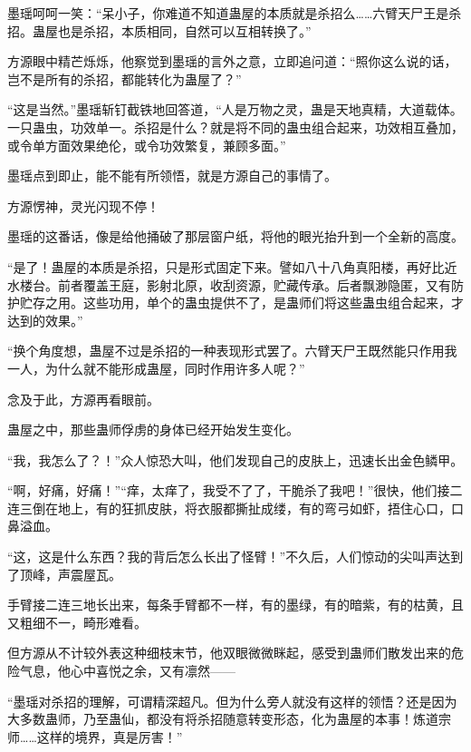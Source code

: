\begin{this_body}
墨瑶呵呵一笑：“呆小子，你难道不知道蛊屋的本质就是杀招么……六臂天尸王是杀招。蛊屋也是杀招，本质相同，自然可以互相转换了。”

方源眼中精芒烁烁，他察觉到墨瑶的言外之意，立即追问道：“照你这么说的话，岂不是所有的杀招，都能转化为蛊屋了？”

“这是当然。”墨瑶斩钉截铁地回答道，“人是万物之灵，蛊是天地真精，大道载体。一只蛊虫，功效单一。杀招是什么？就是将不同的蛊虫组合起来，功效相互叠加，或令单方面效果绝伦，或令功效繁复，兼顾多面。”

墨瑶点到即止，能不能有所领悟，就是方源自己的事情了。

方源愣神，灵光闪现不停！

墨瑶的这番话，像是给他捅破了那层窗户纸，将他的眼光抬升到一个全新的高度。

“是了！蛊屋的本质是杀招，只是形式固定下来。譬如八十八角真阳楼，再好比近水楼台。前者覆盖王庭，影射北原，收刮资源，贮藏传承。后者飘渺隐匿，又有防护贮存之用。这些功用，单个的蛊虫提供不了，是蛊师们将这些蛊虫组合起来，才达到的效果。”

“换个角度想，蛊屋不过是杀招的一种表现形式罢了。六臂天尸王既然能只作用我一人，为什么就不能形成蛊屋，同时作用许多人呢？”

念及于此，方源再看眼前。

蛊屋之中，那些蛊师俘虏的身体已经开始发生变化。

“我，我怎么了？！”众人惊恐大叫，他们发现自己的皮肤上，迅速长出金色鳞甲。

“啊，好痛，好痛！”“痒，太痒了，我受不了了，干脆杀了我吧！”很快，他们接二连三倒在地上，有的狂抓皮肤，将衣服都撕扯成缕，有的弯弓如虾，捂住心口，口鼻溢血。

“这，这是什么东西？我的背后怎么长出了怪臂！”不久后，人们惊动的尖叫声达到了顶峰，声震屋瓦。

手臂接二连三地长出来，每条手臂都不一样，有的墨绿，有的暗紫，有的枯黄，且又粗细不一，畸形难看。

但方源从不计较外表这种细枝末节，他双眼微微眯起，感受到蛊师们散发出来的危险气息，他心中喜悦之余，又有凛然——

“墨瑶对杀招的理解，可谓精深超凡。但为什么旁人就没有这样的领悟？还是因为大多数蛊师，乃至蛊仙，都没有将杀招随意转变形态，化为蛊屋的本事！炼道宗师……这样的境界，真是厉害！”

\end{this_body}

